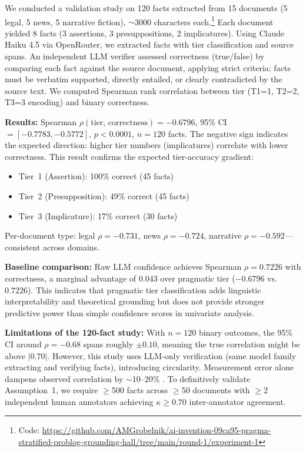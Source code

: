 \documentclass[11pt,letterpaper]{article}
\begin{document}
We conducted a validation study on 120 facts extracted from 15 documents (5 legal, 5 news, 5 narrative fiction), $\sim$3000 characters each.\footnote{Code: \url{https://github.com/AMGrobelnik/ai-invention-09ca95-pragma-stratified-problog-grounding-hall/tree/main/round-1/experiment-1}} Each document yielded 8 facts (3 assertions, 3 presuppositions, 2 implicatures). Using Claude Haiku 4.5 via OpenRouter, we extracted facts with tier classification and source spans. An independent LLM verifier assessed correctness (true/false) by comparing each fact against the source document, applying strict criteria: facts must be verbatim supported, directly entailed, or clearly contradicted by the source text. We computed Spearman rank correlation between tier (T1=1, T2=2, T3=3 encoding) and binary correctness.

\textbf{Results:} Spearman $\rho(\text{tier, correctness}) = -0.6796$, 95\% CI$=[-0.7783, -0.5772]$, $p<0.0001$, $n=120$ facts. The negative sign indicates the expected direction: higher tier numbers (implicatures) correlate with lower correctness. This result confirms the expected tier-accuracy gradient:
\begin{itemize}
  \item Tier~1 (Assertion): 100\% correct (45 facts)
  \item Tier~2 (Presupposition): 49\% correct (45 facts)
  \item Tier~3 (Implicature): 17\% correct (30 facts)
\end{itemize}

Per-document type: legal $\rho=-0.731$, news $\rho=-0.724$, narrative $\rho=-0.592$---consistent across domains.

\textbf{Baseline comparison:} Raw LLM confidence achieves Spearman $\rho=0.7226$ with correctness, a marginal advantage of 0.043 over pragmatic tier ($-0.6796$ vs.\ $0.7226$). This indicates that pragmatic tier classification adds linguistic interpretability and theoretical grounding but does not provide stronger predictive power than simple confidence scores in univariate analysis.

\textbf{Limitations of the 120-fact study:} With $n=120$ binary outcomes, the 95\% CI around $\rho=-0.68$ spans roughly $\pm0.10$, meaning the true correlation might be above $|0.70|$. However, this study uses LLM-only verification (same model family extracting and verifying facts), introducing circularity. Measurement error alone dampens observed correlation by $\sim$10--20\% \citep{Spearman1910}. To definitively validate Assumption~1, we require $\geq$500 facts across $\geq$50 documents with $\geq$2 independent human annotators achieving $\kappa\geq0.70$ inter-annotator agreement.
\end{document}
